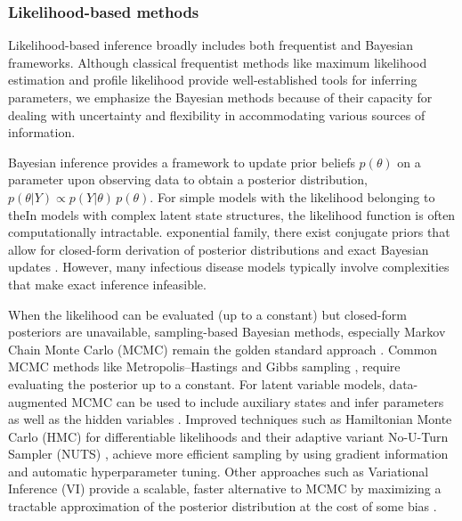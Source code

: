 \documentclass{article}
\begin{document}
\subsubsection{Likelihood-based methods}
Likelihood-based inference broadly includes both frequentist and Bayesian frameworks. Although classical frequentist methods like maximum likelihood estimation \citep{myung2003tutorial, baltazar2024maximum} and profile likelihood \citep{tonsing2018profile, plank2024structured} provide well-established tools for inferring parameters, we emphasize the Bayesian methods because of their capacity for dealing with uncertainty and flexibility in accommodating various sources of information.

Bayesian inference provides a framework to update prior beliefs $ p(\theta)$ on a parameter upon observing data to obtain a posterior distribution, $p(\theta | Y) \propto p(Y|\theta) \,p(\theta)$. For simple models with the likelihood belonging to theIn models with complex latent state structures, the likelihood function is often computationally intractable. exponential family, there exist conjugate priors that allow for closed-form derivation of posterior distributions and exact Bayesian updates \citep{gelman1995bayesian, lawson2018bayesian, cori2013new}. However, many infectious disease models typically involve complexities that make exact inference infeasible.


When the likelihood can be evaluated (up to a constant) but closed-form posteriors are unavailable, sampling-based Bayesian methods, especially Markov Chain Monte Carlo (MCMC) remain the golden standard approach \citep{gilks1995markov, lekone2006statistical}. Common MCMC methods like Metropolis–Hastings \citep{hastings1970monte} and Gibbs sampling \citep{geman1984stochastic}, require evaluating the posterior up to a constant. For latent variable models, data-augmented MCMC can be used to include auxiliary states and infer parameters as well as the hidden variables \citep{o1999bayesian}. Improved techniques such as Hamiltonian Monte Carlo (HMC) for differentiable likelihoods \citep{duane1987hybrid} and their adaptive variant No-U-Turn Sampler (NUTS) \citep{hoffman2014no, andrade2020evaluation}, achieve more efficient sampling by using gradient information and automatic hyperparameter tuning.  Other approaches such as Variational Inference (VI) provide a scalable, faster alternative to MCMC by maximizing a tractable approximation of the posterior distribution at the cost of some bias \citep{blei2017variational, chatzilena2019contemporary}.
\end{document}
